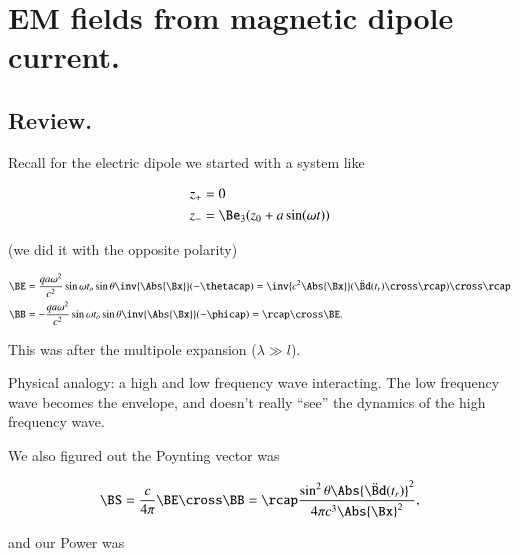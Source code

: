 %
%

\chapter{EM fields from magnetic dipole current.}
\label{chap:relativisticElectrodynamicsT8}
{}
\date{Mar 23, 2011}

\beginArtWithToc

\section{Review.}

Recall for the electric dipole we started with a system like

\begin{align}\label{eqn:relativisticElectrodynamicsL21:10}
z_{+} &= 0 \\
z_{-} &= \Be_3( z_0 + a \sin(\omega t))
\end{align}

(we did it with the opposite polarity)

\begin{align}\label{eqn:relativisticElectrodynamicsT8:10}
\BE &= \frac{q a \omega^2}{c^2} \sin\omega t_o \sin\theta \inv{\Abs{\Bx}} (- \thetacap ) = \inv{c^2 \Abs{\Bx}} (\ddot{\Bd}(t_r) \cross \rcap ) \cross \rcap  \\
\BB &= -\frac{q a \omega^2}{c^2} \sin\omega t_o \sin\theta \inv{\Abs{\Bx}} (- \phicap ) = \rcap \cross \BE.
\end{align}

This was after the multipole expansion ($\lambda \gg l$).

Physical analogy: a high and low frequency wave interacting.  The low frequency wave becomes the envelope, and doesn't really ``see'' the dynamics of the high frequency wave.

We also figured out the Poynting vector was

\begin{equation}\label{eqn:relativisticElectrodynamicsT8:30}
\BS = \frac{c}{4\pi} \BE \cross \BB = \rcap \frac{ \sin^2 \theta \Abs{\ddot{\Bd}(t_r) }^2 }{ 4 \pi c^3 \Abs{\Bx}^2},
\end{equation}

and our Power was

